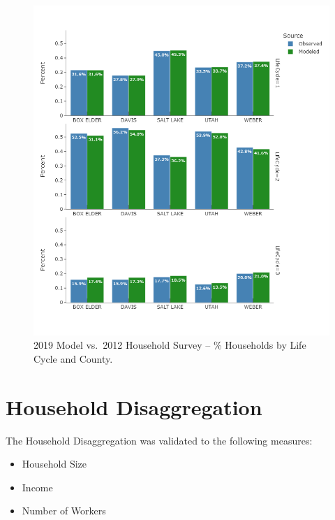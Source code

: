 \documentclass[
  letterpaper,
  DIV=11,
  numbers=noendperiod]{scrreprt}
\providecommand{\tightlist}{%
  \setlength{\itemsep}{0pt}\setlength{\parskip}{0pt}}\usepackage{longtable,booktabs,array}
\begin{document}
\begin{figure}[H]

{\centering \includegraphics{v9x/v900/validation/_pictures/1-plot5.png}

}

\caption{\label{fig-pdf-lc-hh}2019 Model vs.~2012 Household Survey -- \%
Households by Life Cycle and County.}

\end{figure}

\hypertarget{household-disaggregation}{%
\section{Household Disaggregation}\label{household-disaggregation}}

The Household Disaggregation was validated to the following measures:

\begin{itemize}
\tightlist
\item
  Household Size
\item
  Income
\item
  Number of Workers
\end{itemize}
\end{document}
